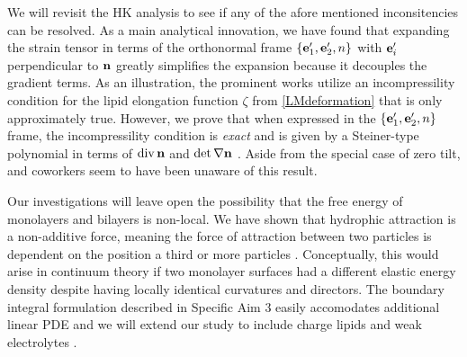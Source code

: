   We will revisit the HK analysis to see if any of the afore mentioned inconsitencies can be resolved.
  As a main analytical innovation, we have found that expanding the strain tensor in
  terms of the orthonormal frame $\{{\bf e}'_1, {\bf e}'_2, n\}$ with ${\bf e}'_i$ perpendicular to ${\bf n}$
  greatly simplifies the expansion because it decouples the gradient terms. As an illustration, the prominent works
  \cite{TerziDeserno17, PhysRevE.102.042406, Hamm2000, C9SM02079A} utilize an
  incompressility condition for the lipid elongation function $\zeta$ from \eqref{LMdeformation} that is only approximately true. 
  However, we prove that when expressed in the $\{{\bf e}'_1, {\bf e}'_2, n\}$ frame, the incompressility condition is \emph{exact}
  and is given by a Steiner-type polynomial in terms of $\operatorname{div} {\bf n}$ and $\det \nabla {\bf n}$ \cite{Fe59}.
  Aside from the special case of zero tilt, \cite{Hamm2000} and coworkers seem to have been unaware of this result.

Our investigations will leave open the possibility that the free energy of monolayers and bilayers is non-local. 
We have shown that hydrophic attraction is a non-additive force, meaning the force of attraction between two
particles is dependent on the position a third or more particles \cite{SilveraBatista1242477}.
Conceptually, this would arise in continuum theory if two monolayer surfaces
had a different elastic energy density despite having locally identical curvatures and directors.
The boundary integral formulation described in Specific Aim 3 easily accomodates additional linear PDE and
we will extend our study to include charge lipids and weak electrolytes \cite{C9SM00772E}.



